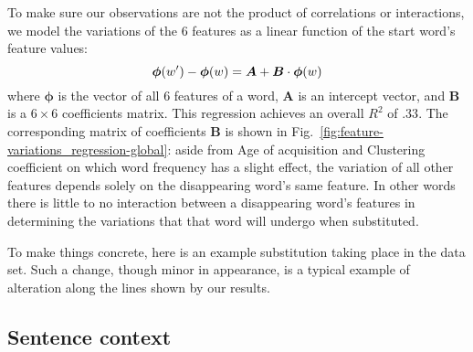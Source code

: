 \begin{new}

To make sure our observations are not the product of correlations or interactions, we model the variations of the 6 features as a linear function of the start word's feature values:
$$\bm{\phi}(\warrival) - \bm{\phi}(\wstart) = \bm{A} +  \bm{B} \cdot \bm{\phi}(\wstart)$$
where $\bm{\phi}$ is the vector of all 6 features of a word, $\bm{A}$ is an intercept vector, and $\bm{B}$ is a $6 \times 6$ coefficients matrix.
This regression achieves an overall $R^2$ of $.33$.
The corresponding matrix of coefficients $\bm{B}$ is shown in Fig.~\ref{fig:feature-variations_regression-global}:
aside from Age of acquisition and Clustering coefficient on which word frequency has a slight effect, the variation of all other features depends solely on the disappearing word's same feature.
In other words there is little to no interaction between a disappearing word's features in determining the variations that that word will undergo when substituted.

\end{new}

To make things concrete, here is an example substitution taking place in the data set.
Such a change, though minor in appearance, is a typical example of alteration along the lines shown by our results.


\subsection{Sentence context}

